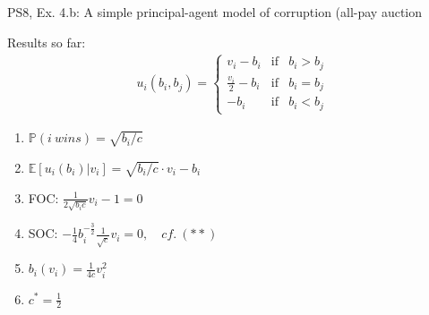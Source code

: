 \begin{frame}{PS8, Ex. 4.b: A simple principal-agent model of corruption (all-pay auction}
\begin{multicols}{2}
\begin{itemize}
      \end{itemize}
      \vspace{-6pt}
      Results so far: \vspace{-6pt}
      \begin{align*}
        u_i(b_i,b_j)=\left\{\begin{array}{lcl}
          v_i-b_i           & \text{if} & b_i>b_j \\
          \frac{v_i}{2}-b_i & \text{if} & b_i=b_j \\
          -b_i              & \text{if} & b_i<b_j
        \end{array}\right.
      \end{align*} \vspace{-16pt}
      \begin{enumerate}
        \item $\mathbb{P}(i\ wins)=\sqrt{b_i/c}$
        \item $\mathbb{E}[u_i(b_i)|v_i]=\sqrt{b_i/c}\cdot v_i-b_i$
        \item FOC: $\frac{1}{2\sqrt{b_ic}}v_i-1=0$
        \item[] SOC: $-\frac{1}{4}b_i^{-\frac{3}{2}}\frac{1}{\sqrt{c}}v_i=0,\quad cf.\ (**)$
        \item $b_i(v_i)=\frac{1}{4c}v_i^2$
        \item $c^*=\frac{1}{2}$
      \end{enumerate}
      \vfill\null
    \end{multicols}
\end{frame}
